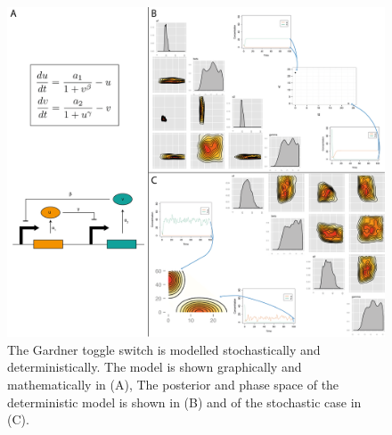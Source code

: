 \begin{figure}[p]
\centering
\includegraphics[scale=0.45]{chapterModelling/images/Gardner/summary.png}
\caption[The stochastic and deterministic cases of the Gardner toggle switch]{The Gardner toggle switch is modelled stochastically and deterministically. The model is shown graphically and mathematically in (A), The posterior and phase space of the deterministic model is shown in (B) and of the stochastic case in (C).}
\label{fig:Gard_summary}
\end{figure}


